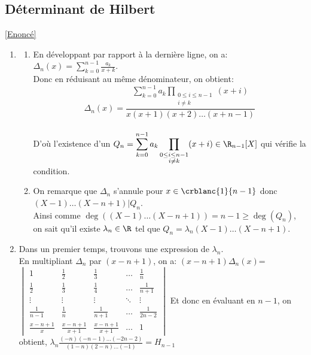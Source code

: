 \documentclass[8pt]{book}
\begin{document}
	\subsection{Déterminant de Hilbert }
	\label{Déterminant de Hilbert corrigé}
	\textcolor{blue}{\hyperref[Déterminant de Hilbert]{[Enoncé]}}\\
	\begin{enumerate}[leftmargin=*]
		\item 
		\begin{enumerate}[label=\alph*.]
			\item En développant par rapport à la dernière ligne, on a: $\Delta_n(x)=\displaystyle\sum_{k=0}^{n-1}\frac{a_k}{x+k}$.
			\\Donc en réduisant au même dénominateur, on obtient: 
			\[\Delta_n(x)=\displaystyle\frac{\displaystyle\sum_{k=0}^{n-1} a_k\displaystyle\prod\limits_{\substack{0\leq i\leq n-1\\i\ne k}}(x+i)}{x(x+1)(x+2)\dots(x+n-1)}\]
			\\D'où l'existence d'un $Q_n=\displaystyle\sum_{k=0}^{n-1} a_k\displaystyle\prod\limits_{\substack{0\leq i\leq n-1\\i\ne k}}(x+i)\in\R_{n-1}[X]$ qui vérifie la condition.
			\item On remarque que $\Delta_n$ s'annule pour $x\in\crblanc{1}{n-1}$ donc $(X-1)\dots(X-n+1)|Q_n$.
			\\Ainsi comme $\deg((X-1)\dots(X-n+1))=n-1\geq \deg(Q_n)$, on sait qu'il existe $\lambda_n\in\R$ tel que $Q_n=\lambda_n(X-1)\dots(X-n+1)$.
		\end{enumerate}
		\item Dans un premier temps, trouvons une expression de $\lambda_n$.
		\\En multipliant $\Delta_n$ par $(x-n+1)$, on a: $(x-n+1)\Delta_n(x)$=
		$\begin{vmatrix}
			1            &\frac{1}{2}  &\frac{1}{3}  &\dots &\frac{1}{n}\\
			\frac{1}{2}  &\frac{1}{3}  &\frac{1}{4}  &\dots &\frac{1}{n+1}\\
			\vdots       &\vdots       &\vdots       &\ddots&\vdots\\
			\frac{1}{n-1}&\frac{1}{n}  &\frac{1}{n+1}&\dots &\frac{1}{2n-2}\\
			\frac{x-n+1}{x}  &\frac{x-n+1}{x+1}&\frac{x-n+1}{x+1}&\dots &1
		\end{vmatrix}$
		Et donc en évaluant en $n-1$, on obtient, $\lambda_n\displaystyle\frac{(-n)(-n-1)\dots(-2n-2)}{(1-n)(2-n)\dots(-1)}=H_{n-1}$

\end{enumerate}
\end{document}
